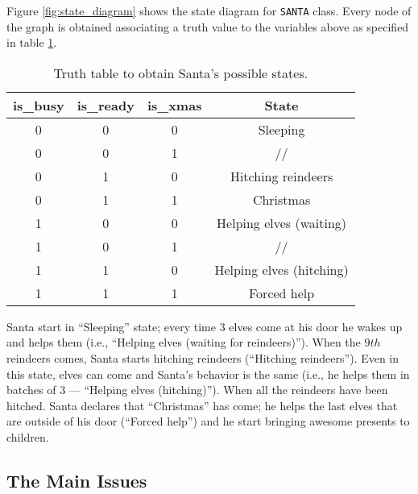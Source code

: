 
Figure \ref{fig:state_diagram} shows the state diagram for \texttt{SANTA} class.
Every node of the graph is obtained associating a truth value to the variables above
as specified in table \ref{table:santa_truth_table}.

\begin{table}[h!]
\centering
\caption{Truth table to obtain Santa's possible states.}
\label{table:santa_truth_table}
\begin{tabular}{|c|c|c|c|}
\hline
\textbf{is\_busy} & \textbf{is\_ready} & \textbf{is\_xmas} & \textbf{State}           \\ \hline
0                 & 0                  & 0                 & Sleeping                 \\ \hline
0                 & 0                  & 1                 & //                       \\ \hline
0                 & 1                  & 0                 & Hitching reindeers       \\ \hline
0                 & 1                  & 1                 & Christmas                \\ \hline
1                 & 0                  & 0                 & Helping elves (waiting)  \\ \hline
1                 & 0                  & 1                 & //                       \\ \hline
1                 & 1                  & 0                 & Helping elves (hitching) \\ \hline
1                 & 1                  & 1                 & Forced help              \\ \hline
\end{tabular}
\end{table}

Santa start in ``Sleeping'' state; every time $3$ elves come at his door he
wakes up and helps them (i.e., ``Helping elves (waiting for reindeers)'').
When the $9th$ reindeers comes, Santa starts hitching reindeers (``Hitching
reindeers''). Even in this state, elves can come and Santa's behavior is the
same (i.e., he helps them in batches of $3$ --- ``Helping elves (hitching)'').
When all the reindeers have been hitched.  Santa declares that ``Christmas''
has come; he helps the last elves that are outside of his door (``Forced
help'') and he start bringing awesome presents to children.

\subsection{The Main Issues}

